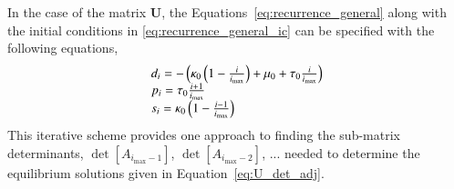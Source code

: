 \documentclass[review]{elsarticle}
\newcommand{\imax}{\ensuremath{i_{\max}}\xspace}
\let\bs\boldsymbol
\begin{document}
In the case of the matrix $\bs{U}$, the Equations~\ref{eq:recurrence_general} along with the initial conditions in \ref{eq:recurrence_general_ic} can be specified with the following equations,
\[
\begin{array}{l}
d_{i}=-\left(\kappa_0\left(1-\frac{i}{\imax}\right)+\mu_0+\text{\ensuremath{\tau_0\frac{i}{\imax}}}\right)\\
p_{i}=\tau_0\frac{i+1}{\imax}\\
  s_{i}=\kappa_0\left(1-\frac{i-1}{\imax}\right)
\end{array}
\]
This iterative scheme provides one approach to finding the sub-matrix determinants, $\det[A_{\imax-1}]$, $\det[A_{\imax-2}]$, $... $ needed to determine the equilibrium solutions given in Equation~\ref{eq:U_det_adj}. 



 

\end{document}
